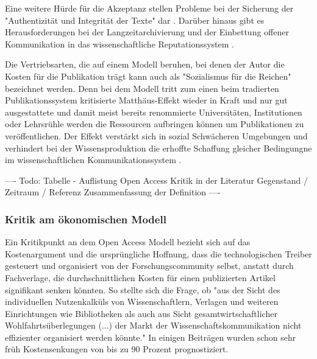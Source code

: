 Eine weitere Hürde für die Akzeptanz stellen Probleme bei der Sicherung der "Authentizität und Integrität der Texte" dar \cite{weishaupt_2009_goldenOA}. Darüber hinaus gibt es Herausforderungen bei der Langzeitarchivierung und der Einbettung offener Kommunikation in das wissenschaftliche Reputationssystem \cite{weishaupt_2009_goldenOA} \cite{Suber_2002} \cite{Adema_2014_open_access}.

Die Vertriebsarten, die auf einem Modell beruhen, bei denen der Autor die Kosten für die Publikation trägt kann auch als "Sozialismus für die Reichen" \cite{cope2014future} bezeichnet werden. Denn bei dem Modell tritt zum einen beim tradierten Publikationssystem kritisierte Matthäus-Effekt wieder in Kraft und nur gut ausgestattete und damit meist bereits renommierte Universitäten, Institutionen oder Lehrsrühle werden die Ressourcen aufbringen können um Publikationen zu veröffentlichen. Der Effekt verstärkt sich in sozial Schwächeren Umgebungen und verhindert bei der Wissensproduktion die erhoffte Schaffung gleicher Bedingungne im wissenschaftlichen Kommunikationssystem \cite{suchen}.

---- Todo: Tabelle - Auflistung Open Access Kritik in der Literatur
Gegenstand / Zeitraum / Referenz Zusammenfassung der Definition ----

\subsubsection{Kritik am ökonomischen Modell}

Ein Kritikpunkt an dem Open Access Modell bezieht sich auf das Kostenargument und die ursprüngliche Hoffnung, dass die technologischen Treiber gesteuert und organisiert von der Forschungscommunity selbst, anstatt durch Fachverlage, die durchschnittlichen Kosten für einen publizierten Artikel signifikant senken könnten. So stellte sich die Frage, ob "aus der Sicht des individuellen Nutzenkalküls von Wissenschaftlern, Verlagen und weiteren Einrichtungen wie Bibliotheken als auch aus Sicht gesamtwirtschaftlicher Wohlfahrtsüberlegungen (...) der Markt der Wissenschaftskommunikation nicht effizienter organisiert werden könnte."\cite{Hess_2006} In einigen Beiträgen wurden schon sehr früh Kostensenkungen von bis zu 90 Prozent \cite{hilf_2004} \cite{suchen} prognostiziert.


